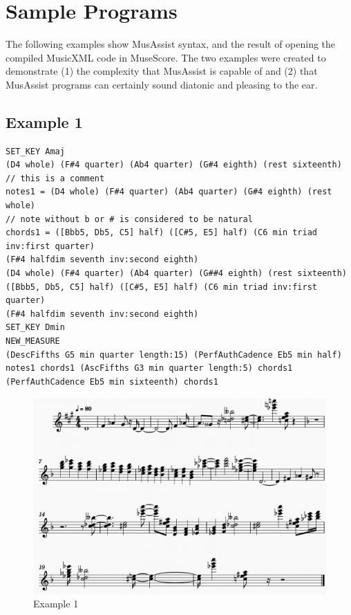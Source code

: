 \documentclass{report}
\begin{document}
\chapter{Sample Programs}
The following examples show MusAssist syntax, and the result of opening the compiled MusicXML code in MuseScore. The two examples were created to demonstrate (1) the complexity that MusAssist is capable of and (2) that MusAssist programs can certainly sound diatonic and pleasing to the ear.

\section{Example 1}
\begin{verbatim}
SET_KEY Amaj
(D4 whole) (F#4 quarter) (Ab4 quarter) (G#4 eighth) (rest sixteenth)           
// this is a comment
notes1 = (D4 whole) (F#4 quarter) (Ab4 quarter) (G#4 eighth) (rest whole)  
// note without b or # is considered to be natural
chords1 = ([Bbb5, Db5, C5] half) ([C#5, E5] half) (C6 min triad inv:first quarter) 
(F#4 halfdim seventh inv:second eighth)
(D4 whole) (F#4 quarter) (Ab4 quarter) (G##4 eighth) (rest sixteenth)
([Bbb5, Db5, C5] half) ([C#5, E5] half) (C6 min triad inv:first quarter) 
(F#4 halfdim seventh inv:second eighth)
SET_KEY Dmin
NEW_MEASURE
(DescFifths G5 min quarter length:15) (PerfAuthCadence Eb5 min half)
notes1 chords1 (AscFifths G3 min quarter length:5) chords1 
(PerfAuthCadence Eb5 min sixteenth) chords1
\end{verbatim}

\begin{figure}[h!]
\centering
\includegraphics[width=\textwidth]{images/program1}
\caption{Example 1}
\label{fig:ex1}
\end{figure}
\end{document}
